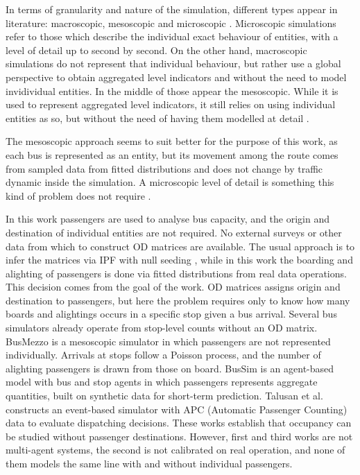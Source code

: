 \documentclass[a4paper,fleqn]{cas-sc}
\begin{document}
In terms of granularity and nature of the simulation, different types
appear in literature: macroscopic, mesoscopic and microscopic \cite{burghout2004hybrid}.
Microscopic simulations refer to those which describe the individual exact behaviour
of entities, with a level of detail up to second by second.
On the other hand, macroscopic simulations do not represent that individual behaviour,
but rather use a global perspective to obtain aggregated level indicators and without
the need to model invidividual entities.
In the middle of those appear the mesoscopic. While it is used to represent aggregated
level indicators, it still relies on using individual entities as so, but without the
need of having them modelled at detail \cite{toledo2010mesoscopic}.

The mesoscopic approach seems to suit better for the purpose of this work, as
each bus is represented as an entity, but its movement among the route
comes from sampled data from fitted distributions and does not change by traffic dynamic
inside the simulation.
A microscopic level of detail is something this kind of problem does
not require \cite{toledo2010mesoscopic}.

In this work passengers are used to analyse bus capacity, and the origin and destination of
individual entities are not required.
No external surveys or other data from which to construct OD matrices are
available. The usual approach is to infer the matrices via IPF with null seeding
\cite{furth1992bus,mccord2010iterative}, while in this work
the boarding and alighting of passengers is done via fitted distributions from real data operations.
This decision comes from the goal of the work. OD matrices assigns
origin and destination to passengers, but here the problem requires only to know how many boards
and alightings occurs in a specific stop given a bus arrival.
Several bus simulators already operate from stop-level counts without an OD
matrix. BusMezzo \cite{toledo2010mesoscopic} is a mesoscopic simulator in
which passengers are not represented individually. Arrivals at stops follow a
Poisson process, and the number of alighting passengers is drawn from those on
board. BusSim \cite{kieu2020dealing} is an agent-based model with bus and stop
agents in which passengers represents aggregate quantities, built on
synthetic data for short-term prediction. Talusan et al.
\cite{talusan2025dispatch} constructs an event-based simulator with APC
(Automatic Passenger Counting) data to evaluate dispatching decisions. These works establish
that occupancy can be studied without passenger destinations. However,
first and third works are not multi-agent systems, the second is not calibrated
on real operation, and none of them models the same line with and without
individual passengers.
\end{document}
